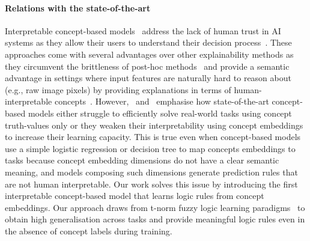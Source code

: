 \paragraph{Relations with the state-of-the-art}
Interpretable concept-based models~\cite{koh2020concept} address the lack of human trust in AI systems as they allow their users to understand their decision process~\cite{rudin2019stop}.
These approaches come with several advantages over other explainability methods as they circumvent the brittleness of post-hoc methods~\citep{adebayo2018sanity, kindermans2019reliability} and provide a semantic advantage in settings where input features are naturally hard to reason about (e.g., raw image pixels) by providing explanations in terms of human-interpretable concepts~\cite{ghorbani2019interpretation}.
However,~\citet{zarlenga2022concept} and~\citet{mahinpei2021promises} emphasise how state-of-the-art concept-based models
either struggle to efficiently solve real-world tasks using concept truth-values only or they weaken their interpretability using concept embeddings to increase their learning capacity. This is true even when concept-based models use a simple logistic regression or decision tree to map concepts embeddings to tasks because concept embedding dimensions do not have a clear semantic meaning, and models composing such dimensions generate prediction rules that are not human interpretable. Our work solves this issue by introducing the first interpretable concept-based model that learns logic rules from concept embeddings. Our approach draws from t-norm fuzzy logic learning paradigms~\cite{diligenti2021constraint,badreddine2022logic,van2022analyzing} to obtain high generalisation across tasks and provide meaningful logic rules even in the absence of concept labels during training.


